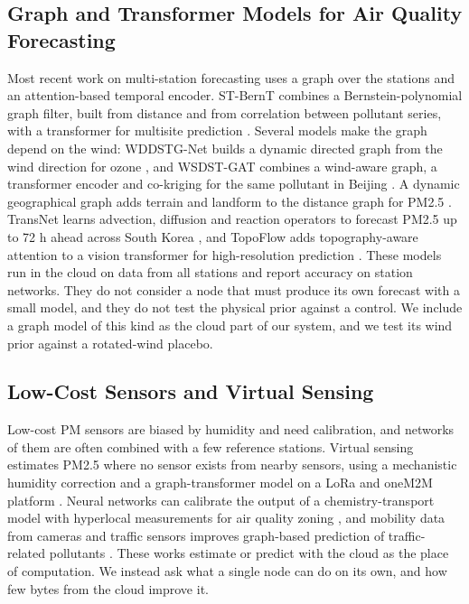 \documentclass[journal]{IEEEtran}
\begin{document}
\subsection{Graph and Transformer Models for Air Quality Forecasting}
Most recent work on multi-station forecasting uses a graph over the stations and an attention-based temporal encoder. ST-BernT combines a Bernstein-polynomial graph filter, built from distance and from correlation between pollutant series, with a transformer for multisite prediction \cite{qi2026bernt}. Several models make the graph depend on the wind: WDDSTG-Net builds a dynamic directed graph from the wind direction for ozone \cite{wang2024wddstg}, and WSDST-GAT combines a wind-aware graph, a transformer encoder and co-kriging for the same pollutant in Beijing \cite{wu2026wsdst}. A dynamic geographical graph adds terrain and landform to the distance graph for PM2.5 \cite{zhao2025dggnn}. TransNet learns advection, diffusion and reaction operators to forecast PM2.5 up to 72 h ahead across South Korea \cite{dimri2026transnet}, and TopoFlow adds topography-aware attention to a vision transformer for high-resolution prediction \cite{kheder2026topoflow}. These models run in the cloud on data from all stations and report accuracy on station networks. They do not consider a node that must produce its own forecast with a small model, and they do not test the physical prior against a control. We include a graph model of this kind as the cloud part of our system, and we test its wind prior against a rotated-wind placebo.

\subsection{Low-Cost Sensors and Virtual Sensing}
Low-cost PM sensors are biased by humidity and need calibration, and networks of them are often combined with a few reference stations. Virtual sensing estimates PM2.5 where no sensor exists from nearby sensors, using a mechanistic humidity correction and a graph-transformer model on a LoRa and oneM2M platform \cite{an2025gta}. Neural networks can calibrate the output of a chemistry-transport model with hyperlocal measurements for air quality zoning \cite{illueca2024zoning}, and mobility data from cameras and traffic sensors improves graph-based prediction of traffic-related pollutants \cite{morales2025mobility}. These works estimate or predict with the cloud as the place of computation. We instead ask what a single node can do on its own, and how few bytes from the cloud improve it.
\end{document}
